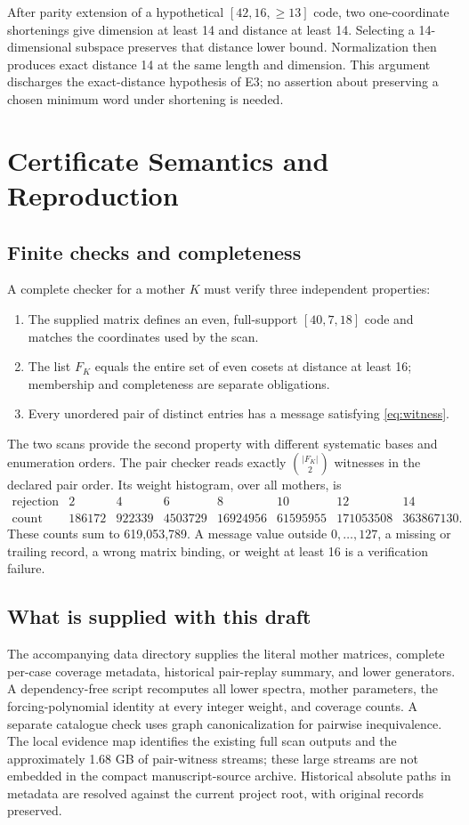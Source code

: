 After parity extension of a hypothetical $[42,16,\ge13]$ code, two one-coordinate shortenings give dimension at least 14 and distance at least 14. Selecting a 14-dimensional subspace preserves that distance lower bound. Normalization then produces exact distance 14 at the same length and dimension. This argument discharges the exact-distance hypothesis of E3; no assertion about preserving a chosen minimum word under shortening is needed.

\section{Certificate Semantics and Reproduction}
\label{app:reproduction}
\subsection{Finite checks and completeness}
A complete checker for a mother $K$ must verify three independent properties:
\begin{enumerate}
\item The supplied matrix defines an even, full-support $[40,7,18]$ code and matches the coordinates used by the scan.
\item The list $F_K$ equals the entire set of even cosets at distance at least 16; membership and completeness are separate obligations.
\item Every unordered pair of distinct entries has a message satisfying \eqref{eq:witness}.
\end{enumerate}
The two scans provide the second property with different systematic bases and enumeration orders. The pair checker reads exactly $\binom{|F_K|}{2}$ witnesses in the declared pair order. Its weight histogram, over all mothers, is
\[
\begin{array}{c|rrrrrrr}
\text{rejection weight}&2&4&6&8&10&12&14\\\hline
\text{count}&186172&922339&4503729&16924956&61595955&171053508&363867130.
\end{array}
\]
These counts sum to 619,053,789. A message value outside $0,\ldots,127$, a missing or trailing record, a wrong matrix binding, or weight at least 16 is a verification failure.

\subsection{What is supplied with this draft}
The accompanying data directory supplies the literal mother matrices, complete per-case coverage metadata, historical pair-replay summary, and lower generators. A dependency-free script recomputes all lower spectra, mother parameters, the forcing-polynomial identity at every integer weight, and coverage counts. A separate catalogue check uses graph canonicalization for pairwise inequivalence. The local evidence map identifies the existing full scan outputs and the approximately 1.68 GB of pair-witness streams; these large streams are not embedded in the compact manuscript-source archive. Historical absolute paths in metadata are resolved against the current project root, with original records preserved.

